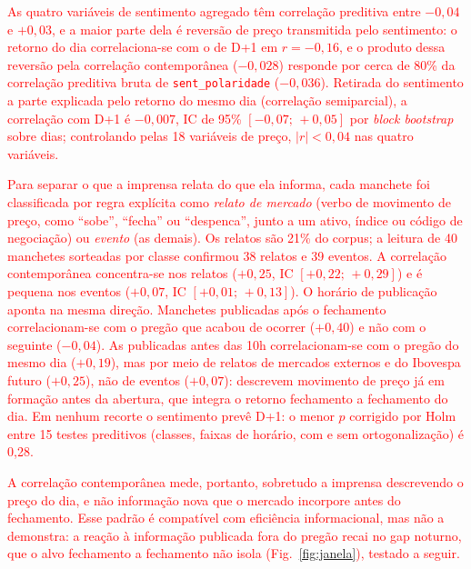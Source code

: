 \documentclass[conference]{IEEEtran}
\newcommand{\novo}[1]{\textcolor{red}{#1}}
\begin{document}
\novo{As quatro vari\'aveis de sentimento agregado t\^em correla\c{c}\~ao preditiva entre $-0{,}04$ e $+0{,}03$, e a maior parte dela \'e revers\~ao de pre\c{c}o transmitida pelo sentimento: o retorno do dia correlaciona-se com o de D+1 em $r=-0{,}16$, e o produto dessa revers\~ao pela correla\c{c}\~ao contempor\^anea ($-0{,}028$) responde por cerca de 80\% da correla\c{c}\~ao preditiva bruta de \texttt{sent\_polaridade} ($-0{,}036$). Retirada do sentimento a parte explicada pelo retorno do mesmo dia (correla\c{c}\~ao semiparcial), a correla\c{c}\~ao com D+1 \'e $-0{,}007$, IC de 95\% $[-0{,}07;\,+0{,}05]$ por \emph{block bootstrap} sobre dias; controlando pelas 18 vari\'aveis de pre\c{c}o, $|r|<0{,}04$ nas quatro vari\'aveis.}

\novo{Para separar o que a imprensa relata do que ela informa, cada manchete foi classificada por regra expl\'icita como \emph{relato de mercado} (verbo de movimento de pre\c{c}o, como ``sobe'', ``fecha'' ou ``despenca'', junto a um ativo, \'indice ou c\'odigo de negocia\c{c}\~ao) ou \emph{evento} (as demais). Os relatos s\~ao 21\% do corpus; a leitura de 40 manchetes sorteadas por classe confirmou 38 relatos e 39 eventos. A correla\c{c}\~ao contempor\^anea concentra-se nos relatos ($+0{,}25$, IC $[+0{,}22;\,+0{,}29]$) e \'e pequena nos eventos ($+0{,}07$, IC $[+0{,}01;\,+0{,}13]$). O hor\'ario de publica\c{c}\~ao aponta na mesma dire\c{c}\~ao. Manchetes publicadas ap\'os o fechamento correlacionam-se com o preg\~ao que acabou de ocorrer ($+0{,}40$) e n\~ao com o seguinte ($-0{,}04$). As publicadas antes das 10h correlacionam-se com o preg\~ao do mesmo dia ($+0{,}19$), mas por meio de relatos de mercados externos e do Ibovespa futuro ($+0{,}25$), n\~ao de eventos ($+0{,}07$): descrevem movimento de pre\c{c}o j\'a em forma\c{c}\~ao antes da abertura, que integra o retorno fechamento a fechamento do dia. Em nenhum recorte o sentimento prev\^e D+1: o menor $p$ corrigido por Holm entre 15 testes preditivos (classes, faixas de hor\'ario, com e sem ortogonaliza\c{c}\~ao) \'e 0,28.}

\novo{A correla\c{c}\~ao contempor\^anea mede, portanto, sobretudo a imprensa descrevendo o pre\c{c}o do dia, e n\~ao informa\c{c}\~ao nova que o mercado incorpore antes do fechamento. Esse padr\~ao \'e compat\'ivel com efici\^encia informacional, mas n\~ao a demonstra: a rea\c{c}\~ao \`a informa\c{c}\~ao publicada fora do preg\~ao recai no gap noturno, que o alvo fechamento a fechamento n\~ao isola (Fig.~\ref{fig:janela}), testado a seguir.}
\end{document}
